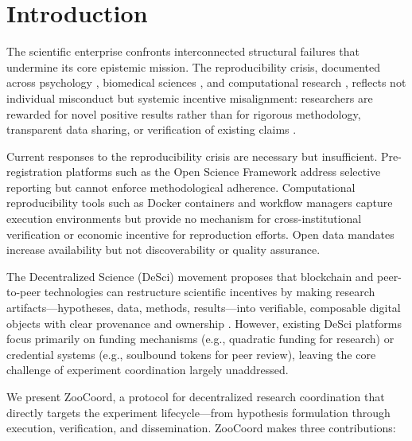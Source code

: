 \documentclass[11pt,a4paper]{article}
\begin{document}
\section{Introduction}
\label{sec:introduction}

The scientific enterprise confronts interconnected structural failures that undermine its core epistemic mission.
The reproducibility crisis, documented across psychology \citep{openscience2015estimating}, biomedical sciences \citep{begley2012drug}, and computational research \citep{hutson2018artificial}, reflects not individual misconduct but systemic incentive misalignment: researchers are rewarded for novel positive results rather than for rigorous methodology, transparent data sharing, or verification of existing claims \citep{smaldino2016natural}.

Current responses to the reproducibility crisis are necessary but insufficient.
Pre-registration platforms such as the Open Science Framework \citep{nosek2018preregistration} address selective reporting but cannot enforce methodological adherence.
Computational reproducibility tools such as Docker containers and workflow managers \citep{gruning2018practical} capture execution environments but provide no mechanism for cross-institutional verification or economic incentive for reproduction efforts.
Open data mandates \citep{wilkinson2016fair} increase availability but not discoverability or quality assurance.

The Decentralized Science (DeSci) movement proposes that blockchain and peer-to-peer technologies can restructure scientific incentives by making research artifacts---hypotheses, data, methods, results---into verifiable, composable digital objects with clear provenance and ownership \citep{hamburg2019desci}.
However, existing DeSci platforms focus primarily on funding mechanisms (e.g., quadratic funding for research) or credential systems (e.g., soulbound tokens for peer review), leaving the core challenge of experiment coordination largely unaddressed.

We present ZooCoord, a protocol for decentralized research coordination that directly targets the experiment lifecycle---from hypothesis formulation through execution, verification, and dissemination.
ZooCoord makes three contributions:
\end{document}
